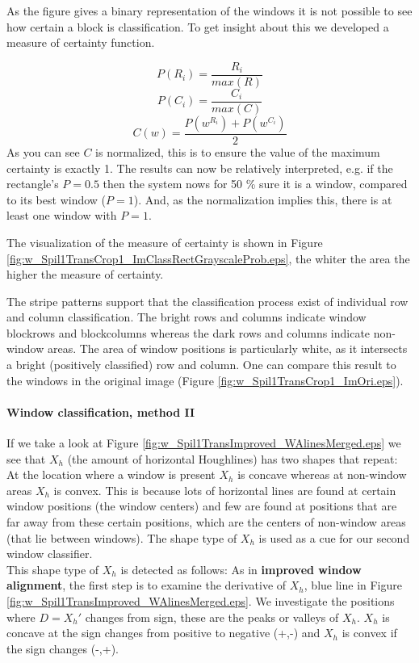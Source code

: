 As the figure gives a binary representation of the windows it is not possible
to see how certain a block is classification.
To get insight about this we developed a measure of certainty function.

\[P(R_i) = \frac{R_i}{max(R)}\]
\[P(C_i) = \frac{C_i}{max(C)}\]
\[C(w) = \frac{P(w^{R_i}) + P(w^{C_i})}{2}\]
As you can see $C$ is normalized, this is to ensure the value of the maximum
certainty is exactly 1. The results can now be relatively interpreted, e.g. if the rectangle's $P=0.5$
then the system nows for 50 \% sure it is a window, compared to its best window ($P=1$). 
And, as the normalization implies this, there is at least one window with $P=1$. 


The visualization of the measure of certainty is shown in Figure
\ref{fig:w_Spil1TransCrop1_ImClassRectGrayscaleProb.eps},  
the whiter the area the higher the measure of certainty.

The stripe patterns support that the classification process exist of individual row and column classification.
The bright rows and columns indicate window blockrows and blockcolumns
whereas the dark rows and columns indicate non-window areas.
The area of window positions is particularly white, as it 
intersects a bright (positively classified) row and column.
One can compare this result to the windows in the original image 
(Figure \ref{fig:w_Spil1TransCrop1_ImOri.eps}).


\paragraph{Window classification, method II}
If we take a look at Figure \ref{fig:w_Spil1TransImproved_WAlinesMerged.eps}
we see that $X_h$ (the amount of horizontal Houghlines) has two shapes that
repeat:  At the location where a window is present $X_h$ is concave whereas at
non-window areas $X_h$ is convex. This is because lots of
horizontal lines are found at certain window positions (the window centers) and few
are found at positions that are far away from these certain positions, which are the
centers of non-window areas (that lie between windows).  The shape type of $X_h$ is
used as a cue for our second window classifier.\\

This shape type of $X_h$ is detected as follows:
As in \textbf{improved window alignment}, the first step is to examine the derivative of $X_h$, blue line in Figure \ref{fig:w_Spil1TransImproved_WAlinesMerged.eps}.
We investigate the positions where $D=X_{h}'$ changes from sign, these are the peaks or valleys of $X_h$. $X_h$ is concave at the sign changes from positive to negative (+,-) and $X_h$ is convex if the sign changes (-,+).\\

